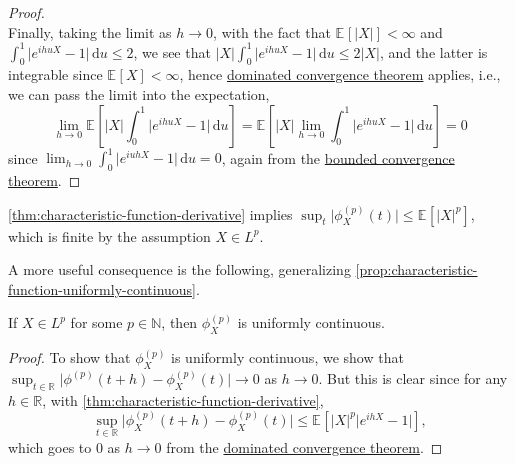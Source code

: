 \begin{proof}
\[	\]
	Finally, taking the limit as \(h \to 0\), with the fact that \(\mathbb{E}_{}[\vert X \vert ] < \infty \) and \(\int_{0}^{1} \vert e^{i hu X} - 1 \vert \,\mathrm{d}u \leq 2\), we see that \(\vert X \vert \int_{0}^{1} \vert e^{ihuX} - 1 \vert \,\mathrm{d}u \leq 2 \vert X \vert \), and the latter is integrable since \(\mathbb{E}_{}[X] < \infty \), hence \href{https://en.wikipedia.org/wiki/Dominated_convergence_theorem}{dominated convergence theorem} applies, i.e., we can pass the limit into the expectation,
	\[
		\lim_{h \to 0} \mathbb{E}_{}\left[\vert X \vert \int_{0}^{1} \vert e^{ihuX} - 1 \vert \,\mathrm{d}u \right]
		= \mathbb{E}_{}\left[\vert X \vert \lim_{h \to 0} \int_{0}^{1} \vert e^{ihuX} - 1 \vert \,\mathrm{d}u \right]
		= 0
	\]
	since \(\lim_{h \to 0} \int_{0}^{1} \vert e^{iuhX} - 1\vert \,\mathrm{d}u = 0\), again from the \href{https://en.wikipedia.org/wiki/Dominated_convergence_theorem}{bounded convergence theorem}.
\end{proof}

\begin{remark}
	\autoref{thm:characteristic-function-derivative} implies \(\sup _t \vert \phi _X^{(p)} (t) \vert \leq \mathbb{E}_{}[\vert X \vert ^p] \), which is finite by the assumption \(X \in L^p\).
\end{remark}

A more useful consequence is the following, generalizing \autoref{prop:characteristic-function-uniformly-continuous}.

\begin{corollary}
	If \(X \in L^p\) for some \(p \in \mathbb{N} \), then \(\phi _X^{(p)}\) is uniformly continuous.
\end{corollary}
\begin{proof}
	To show that \(\phi _X^{(p)}\) is uniformly continuous, we show that \(\sup _{t\in \mathbb{R} } \vert \phi ^{(p)}(t + h) - \phi _X^{(p)}(t) \vert \to 0\) as \(h \to 0\). But this is clear since for any \(h \in \mathbb{R} \), with \autoref{thm:characteristic-function-derivative},
	\[
		\sup _{t\in \mathbb{R} } \vert \phi _X^{(p)} (t + h) - \phi _X^{(p)}(t) \vert
		\leq \mathbb{E}_{}\left[\vert X \vert ^p \vert e^{ih X} - 1\vert \right],
	\]
	which goes to \(0\) as \(h \to 0\) from the \href{https://en.wikipedia.org/wiki/Dominated_convergence_theorem}{dominated convergence theorem}.
\end{proof}